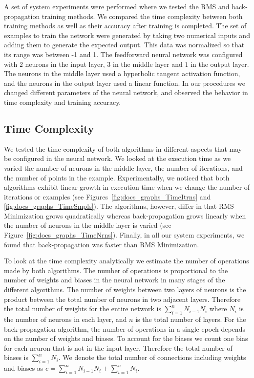 \documentclass[11pt]{article}
\begin{document}
A set of system experiments were performed where we tested the RMS and back-propagation training methods. We compared the time
complexity between both training methods as well as their accuracy after training is completed. The set of examples to train
the network were generated by taking two numerical inputs and adding them to generate the expected output. This data was
normalized so that its range was between -1 and 1. The feedforward neural network was configured with $2$ neurons in the input
layer, $3$ in the middle layer and $1$ in the output layer. The neurons in the middle layer used a hyperbolic tangent
activation function, and the neurons in the output layer used a linear function. In our procedures we changed different
parameters of the neural network, and observed the behavior in time complexity and training accuracy.

\subsection{Time Complexity} %
\label{sub:time_complexity}

We tested the time complexity of both algorithms in different aspects that may be configured in the neural network. We looked at the
execution time as we varied the number of neurons in the middle layer, the number of iterations, and the number of points in the
example. Experimentally, we noticed that both algorithms exhibit linear growth in execution time when we change the number of iterations
or examples (see Figures~\ref{fig:docs_graphs_TimeItrns} and \ref{fig:docs_graphs_TimeSmpls}). The algorithms, however, differ in that
RMS Minimization grows quadratically whereas back-propagation grows linearly when the number of neurons in the middle layer is varied
(see Figure~\ref{fig:docs_graphs_TimeNrns}). Finally, in all our system experiments, we found that back-propagation was faster than RMS
Minimization.

To look at the time complexity analytically we estimate the number of operations made by both algorithms. The number of operations is
proportional to the number of weights and biases in the neural network in many stages of the different algorithms. The number of weights
between two layers of neurons is the product between the total number of neurons in two adjacent layers. Therefore the total number of
weights for the entire network is $\sum_{i=1}^{n}N_{i-1}N_{i}$ where $N_{i}$ is the number of neurons in each layer, and $n$ is the
total number of layers. For the back-propagation algorithm, the number of operations in a single epoch depends on the number of weights
and biases. To account for the biases we count one bias for each neuron that is not in the input layer. Therefore the total number of
biases is $\sum_{i=1}^{n}N_{i}$. We denote the total number of connections including weights and biases as
$c=\sum_{i=1}^{n}N_{i-1}N_{i} + \sum_{i=1}^{n}N_{i}$.
\end{document}

